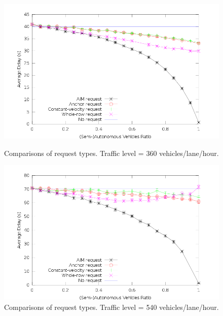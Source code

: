 \begin{figure}[hp]
\centering
\includegraphics[width=0.9\columnwidth]{figures/figure_2.png}
\caption{Comparisons of request types.
Traffic level = 360 vehicles/lane/hour.}
\label{fig:request360}

\vspace{+.5in}

\centering
\includegraphics[width=0.9\columnwidth]{figures/figure_5.png}
\caption{Comparisons of request types.
Traffic level = 540 vehicles/lane/hour.}
\label{fig:request540}
\end{figure}









